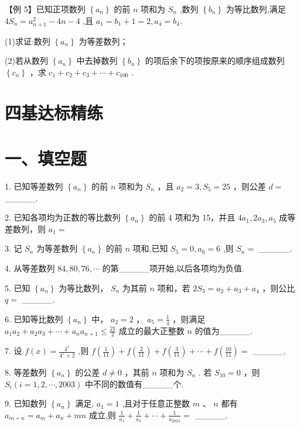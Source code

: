 【例 5】已知正项数列 $\left\{  {a}_{n}\right\}$ 的前 $n$ 项和为 ${S}_{n}$ ,数列 $\left\{  {b}_{n}\right\}$ 为等比数列,满足 $4{S}_{n} = {a}_{n + 1}^{2} - {4n} - 4$ ,且 ${a}_{1} =  {b}_{1} + 1 = 2,{a}_{4} = {b}_{4}.$

(1)求证:数列 $\left\{  {a}_{n}\right\}$ 为等差数列；

(2)若从数列 $\left\{  {a}_{n}\right\}$ 中去掉数列 $\left\{  {b}_{n}\right\}$ 的项后余下的项按原来的顺序组成数列 $\left\{  {c}_{n}\right\}$ ，求 ${c}_{1} + {c}_{2} + {c}_{3} + \cdots  + {c}_{100}$ .

\section*{四基达标精练}

\section*{一、填空题}

1. 已知等差数列 $\left\{  {a}_{n}\right\}$ 的前 $n$ 项和为 ${S}_{n}$ ，且 ${a}_{2} = 3,{S}_{5} = {25}$ ，则公差 $d =$ \_\_\_\_\_.

2. 已知各项均为正数的等比数列 $\left\{  {a}_{n}\right\}$ 的前 4 项和为 15，并且 $4{a}_{1},2{a}_{3},{a}_{5}$ 成等差数列，则 ${a}_{1}  =$

3. 记 ${S}_{n}$ 为等差数列 $\left\{  {a}_{n}\right\}$ 的前 $n$ 项和,已知 ${S}_{5} = 0,{a}_{6} = 6$ ,则 ${S}_{n} =$ \_\_\_\_\_.

4. 从等差数列 ${84},{80},{76},\cdots$ 的第\_\_\_\_\_项开始,以后各项均为负值.

5. 已知 $\left\{  {a}_{n}\right\}$ 为等比数列， ${S}_{n}$ 为其前 $n$ 项和，若 $2{S}_{3} = {a}_{2} + {a}_{3} + {a}_{4}$ ，则公比 $q =$ \_\_\_\_\_.

6. 已知等比数列 $\left\{  {a}_{n}\right\}$ 中， ${a}_{2} = 2$ ， ${a}_{5} = \frac{1}{4}$ ，则满足 ${a}_{1}{a}_{2} + {a}_{2}{a}_{3} + \cdots  + {a}_{n}{a}_{n + 1} \leq  \frac{21}{2}$ 成立的最大正整数 $n$ 的值为\_\_\_\_\_.

7. 设 $f\left( x\right)  = \frac{{4}^{x}}{{4}^{x} + 2}$ ,则 $f\left( \frac{1}{11}\right)  + f\left( \frac{2}{11}\right)  + f\left( \frac{3}{11}\right)  + \cdots  + f\left( \frac{10}{11}\right)  =$ \_\_\_\_\_.

8. 等差数列 $\left\{  {a}_{n}\right\}$ 的公差 $d \neq  0$ ，其前 $n$ 项和为 ${S}_{n}$ . 若 ${S}_{10} = 0$ ，则 ${S}_{i}\left( {i = 1,2,\cdots ,{2003}}\right)$ 中不同的数值有\_\_\_\_\_个.

9. 已知数列 $\left\{  {a}_{n}\right\}$ 满足, ${a}_{1} = 1$ ,且对于任意正整数 $m\text{ 、 }n$ 都有 ${a}_{m + n} = {a}_{m} + {a}_{n} + {mn}$ 成立,则 $\frac{1}{{a}_{1}} + \frac{1}{{a}_{2}} + \cdots  +  \frac{1}{{a}_{2023}} =$ \_\_\_\_\_.


